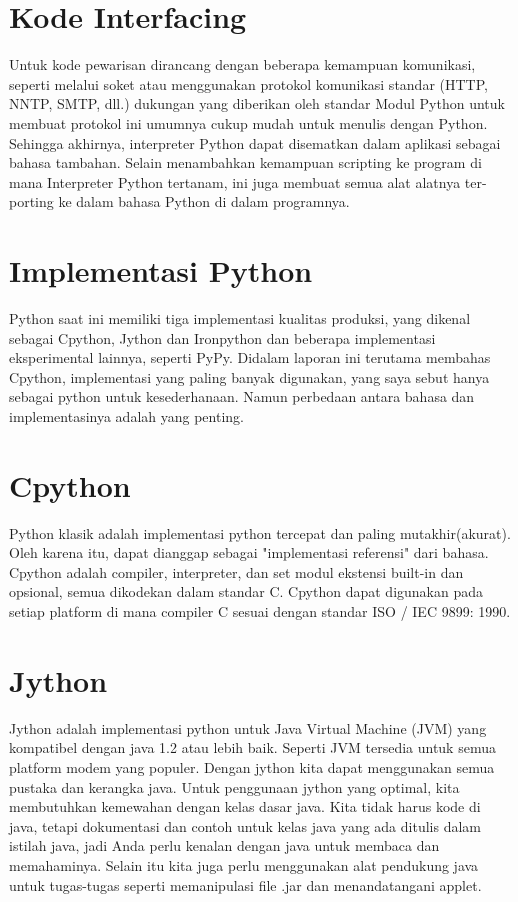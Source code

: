\documentclass[12pt, times new roman, a4paper]{article}
\begin{document}
\section{Kode Interfacing}
Untuk kode pewarisan dirancang dengan beberapa kemampuan komunikasi, seperti melalui soket atau
menggunakan protokol komunikasi standar (HTTP, NNTP, SMTP, dll.) dukungan yang diberikan oleh standar
Modul Python untuk membuat protokol ini umumnya cukup mudah untuk menulis dengan Python.
Sehingga akhirnya, interpreter Python dapat disematkan dalam aplikasi sebagai bahasa tambahan. Selain menambahkan kemampuan scripting ke program di mana Interpreter Python tertanam, ini juga membuat semua alat alatnya ter-porting ke dalam bahasa Python di dalam programnya.

\section{Implementasi Python}
Python saat ini memiliki tiga implementasi kualitas produksi, yang dikenal sebagai Cpython, Jython dan Ironpython dan beberapa implementasi eksperimental lainnya, seperti PyPy. Didalam laporan ini terutama membahas Cpython, implementasi yang paling banyak digunakan, yang saya sebut hanya sebagai python untuk kesederhanaan. Namun perbedaan antara bahasa dan implementasinya adalah yang penting.

\section{Cpython}
Python klasik adalah implementasi python tercepat dan paling mutakhir(akurat). Oleh karena itu, dapat dianggap sebagai "implementasi referensi" dari bahasa. Cpython adalah compiler, interpreter, dan set modul ekstensi built-in dan opsional, semua dikodekan dalam standar C. Cpython dapat digunakan pada setiap platform di mana compiler C sesuai dengan standar ISO / IEC 9899: 1990.

\section{Jython}
Jython adalah implementasi python untuk Java Virtual Machine (JVM) yang kompatibel dengan java 1.2 atau lebih baik. Seperti JVM tersedia untuk semua platform modem yang populer. Dengan jython kita dapat menggunakan semua pustaka dan kerangka java. Untuk penggunaan jython yang optimal, kita membutuhkan kemewahan dengan kelas dasar java. Kita tidak harus kode di java, tetapi dokumentasi dan contoh untuk kelas java yang ada ditulis dalam istilah java, jadi Anda perlu kenalan dengan java untuk membaca dan memahaminya. Selain itu kita juga perlu menggunakan alat pendukung java untuk tugas-tugas seperti memanipulasi file .jar dan menandatangani applet.
\end{document}

